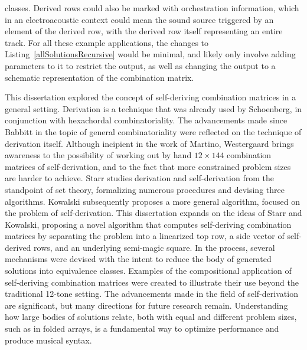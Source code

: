 classes. Derived rows could also be marked with orchestration information, which in an electroacoustic context could mean the sound source triggered by an element of the derived row, with the derived row itself representing an entire track. For all these example applications, the changes to Listing~\ref{allSolutionsRecursive} would be minimal, and likely only involve adding parameters to it to restrict the output, as well as changing the output to a schematic representation of the combination matrix.

This dissertation explored the concept of self-deriving combination matrices in a general setting. Derivation is a technique that was already used by Schoenberg, in conjunction with hexachordal combinatoriality. The advancements made since Babbitt in the topic of general combinatoriality were reflected on the technique of derivation itself. Although incipient in the work of Martino, Westergaard brings awareness to the possibility of working out by hand $12 \times 144$ combination matrices of self-derivation, and to the fact that more constrained problem sizes are harder to achieve. Starr studies derivation and self-derivation from the standpoint of set theory, formalizing numerous procedures and devising three algorithms. Kowalski subsequently proposes a more general algorithm, focused on the problem of self-derivation. This dissertation expands on the ideas of Starr and Kowalski, proposing a novel algorithm that computes self-deriving combination matrices by separating the problem into a linearized top row, a side vector of self-derived rows, and an underlying semi-magic square. In the process, several mechanisms were devised with the intent to reduce the body of generated solutions into equivalence classes. Examples of the compositional application of self-deriving combination matrices were created to illustrate their use beyond the traditional 12-tone setting. The advancements made in the field of self-derivation are significant, but many directions for future research remain. Understanding how large bodies of solutions relate, both with equal and different problem sizes, such as in folded arrays, is a fundamental way to optimize performance and produce musical syntax.
